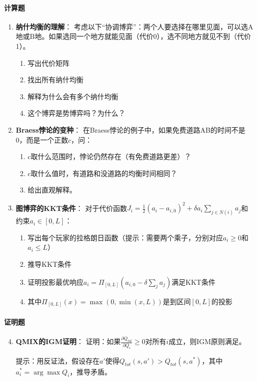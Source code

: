 \paragraph{计算题}
\begin{enumerate}
    \item \textbf{纳什均衡的理解}：
    考虑以下“协调博弈”：两个人要选择在哪里见面，可以选A地或B地。如果选同一个地方就能见面（代价0），选不同地方就见不到（代价1）。
    \begin{enumerate}
        \item 写出代价矩阵
        \item 找出所有纳什均衡
        \item 解释为什么会有多个纳什均衡
        \item 这个博弈是势博弈吗？为什么？
    \end{enumerate}
    
    \item \textbf{Braess悖论的变种}：
    在Braess悖论的例子中，如果免费道路AB的时间不是0，而是一个正数$c$，问：
    \begin{enumerate}
        \item $c$取什么范围时，悖论仍然存在（有免费道路更差）？
        \item $c$取什么值时，有道路和没道路的均衡时间相同？
        \item 给出直观解释。
    \end{enumerate}
    
    \item \textbf{图博弈的KKT条件}：
    对于代价函数$J_i = \frac{1}{2}(a_i - a_{i,0})^2 + \delta a_i \sum_{j \in N(i)} a_j$和约束$a_i \in [0, L]$：
    \begin{enumerate}
        \item 写出每个玩家的拉格朗日函数（提示：需要两个乘子，分别对应$a_i \geq 0$和$a_i \leq L$）
        \item 推导KKT条件
        \item 证明投影最优响应$a_i = \Pi_{[0,L]}(a_{i,0} - \delta \sum_{j} a_j)$满足KKT条件
        \item 其中$\Pi_{[0,L]}(x) = \max(0, \min(x, L))$是到区间$[0,L]$的投影
    \end{enumerate}
    
\end{enumerate}

\paragraph{证明题}
\begin{enumerate}
    \setcounter{enumi}{3}
    \item \textbf{QMIX的IGM证明}：
    证明：如果$\frac{\partial Q_{tot}}{\partial Q_i} \geq 0$对所有$i$成立，则IGM原则满足。
    
    提示：用反证法，假设存在$a'$使得$Q_{tot}(s, a') > Q_{tot}(s, a^*)$，其中$a_i^* = \arg\max Q_i$，推导矛盾。
    
\end{enumerate}


